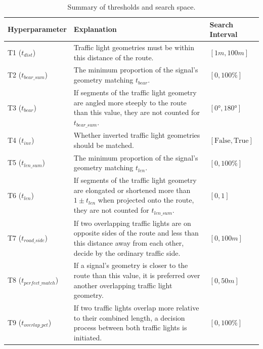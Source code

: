 \begin{table}[t]
\caption{Summary of thresholds and search space.}
\begin{tabular}{@{}lp{8cm}l@{}}
\toprule
\textbf{Hyperparameter}  & \textbf{Explanation} & \textbf{Search Interval} \\
\midrule
T1 ($t_{dist}$) & Traffic light geometries must be within this distance of the route. & $[1m, 100m]$ \\
T2 ($t_{bear\_sum}$) & The minimum proportion of the signal's geometry matching $t_{bear}$. & $[0, 100\%]$ \\
T3 ($t_{bear}$) & If segments of the traffic light geometry are angled more steeply to the route than this value, they are not counted for $t_{bear\_sum}$. & $[0°, 180°]$ \\
T4 ($t_{inv}$) & Whether inverted traffic light geometries should be matched. & $[\text{False}, \text{True}]$ \\
T5 ($t_{len\_sum}$) & The minimum proportion of the signal's geometry matching $t_{len}$. & $[0, 100\%]$ \\
T6 ($t_{len}$) & If segments of the traffic light geometry are elongated or shortened more than $1 \pm t_{len}$ when projected onto the route, they are not counted for $t_{len\_sum}$. & $[0, 1]$\\
T7 ($t_{road\_side}$) & If two overlapping traffic lights are on opposite sides of the route and less than this distance away from each other, decide by the ordinary traffic side. & $[0, 100m]$ \\
T8 ($t_{perfect\_match}$) & If a signal's geometry is closer to the route than this value, it is preferred over another overlapping traffic light geometry. & $[0, 50m]$ \\
T9 ($t_{overlap\_pct}$) & If two traffic lights overlap more relative to their combined length, a decision process between both traffic lights is initiated. & $[0, 100\%]$ \\
\bottomrule
\end{tabular}
\label{tab:hyperparameter-space}
\end{table}


